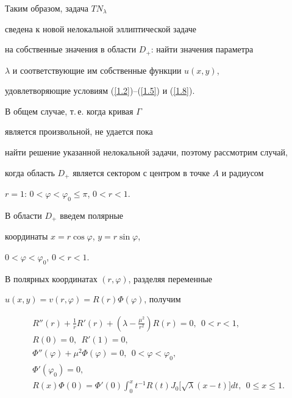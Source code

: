 Таким образом, задача $TN_\lambda$ 


сведена к новой нелокальной эллиптической задаче 


на собственные значения в области $D_+$: найти значения параметра 


$\lambda$ и соответствующие им собственные функции $u(x,y)$,


удовлетворяющие условиям (\ref{1.2})--(\ref{1.5}) и (\ref{1.8}).





В общем случае, т.\,е. когда кривая $\Gamma$ 


является произвольной, не удается пока


найти решение указанной нелокальной задачи, поэтому рассмотрим случай, 


когда область $D_+$ является сектором с центром в точке $A$ и радиусом 


$r=1$: $0<\varphi<\varphi_0\leq\pi$, $0<r<1$. 





В области $D_+$ введем полярные 


координаты $x=r\cos\varphi$, $y=r\sin\varphi$,


$0<\varphi<\varphi_0$, $0<r<1$. 


В полярных координатах $(r,\varphi)$, разделяя переменные 


$u(x,y)=v(r,\varphi)=R(r)\Phi(\varphi)$, получим


\begin{gather}


R''(r)+\frac{1}{r}R'(r)+\left(\lambda-\frac{\mu^2}{r^2}\right)R(r)=0,


\ \ 0<r<1,\label{1.9} \\


%


R(0)=0,\ \ R'(1)=0,\label{1.10} \\


%


\Phi''(\varphi)+\mu^2\Phi(\varphi)=0,\ \ 0<\varphi<\varphi_0,\label{1.11}\\


%


\Phi'(\varphi_0)=0,\;\label{1.12} \\


%


R(x)\Phi(0)=\Phi'(0)\int_0^x t^{-1}R(t)J_0\big[\sqrt\lambda(x-t)


\big]dt,\ \ 0\leq x\leq 1.\label{1.13}


\end{gather}





